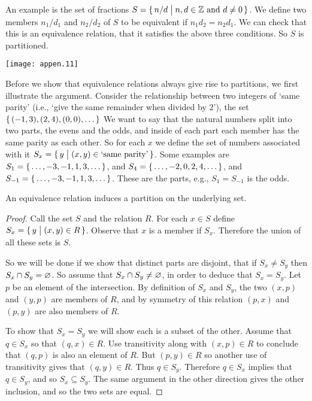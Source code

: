 An example is the set of fractions 
$S=\mbox{$\{\,n/d\bigm| \text{$n,d\in\mathbb{Z}$ and $d\neq 0$}\,\}$}$.
We define two members $n_1/d_1$ and $n_2/d_2$ of $S$ 
to be equivalent if $n_1d_2=n_2d_1$.
We can check that this is an equivalence relation, that
it satisfies the above three conditions.
So $S$ is partitioned.
\begin{center}
  \texttt{[image: appen.11]}
\end{center}

Before we show that equivalence relations always give rise to
partitions, we first illustrate the argument.
Consider the relationship between two integers of `same parity' 
(i.e., `give the same remainder when divided by \( 2 \)'),
the set \( \mbox{$\{\, (-1,3),(2,4),(0,0),\ldots\,\}$} \)
We want to say that the natural numbers split into two parts,
the evens and the odds, and inside of each part each member has the same
parity as each other.
So for each \( x \) we define the set of numbers associated with
it \( S_x=\set{y\suchthat (x,y)\in\text{`same\ parity'}} \).
Some examples are
\( S_1=\mbox{$\{\,\ldots,-3,-1,1,3,\ldots\,\}$} \), and
\( S_4=\mbox{$\{\,\ldots,-2,0,2,4,\ldots\,\}$} \), and
\( S_{-1}=\mbox{$\{\,\ldots,-3,-1,1,3,\ldots\,\}$} \).
These are the parts, e.g., \( S_1=S_{-1} \) is the odds.

\medskip
\par{}
An equivalence relation induces a partition on the underlying set.

\begin{proof}
Call the set \( S \) and the relation \( R \).
For each \( x\in S \) define \( S_x=\mbox{$\{\,y\bigm| (x,y)\in R\,\}$} \).
Observe that \( x \) is a member if \( S_x \).
Therefore the union of all these sets is \( S \).

So we will be done if we show that distinct parts are disjoint, that
if \( S_x\neq S_y \) then \( S_x\cap S_y=\varnothing \).
So assume that \( S_x\cap S_y\neq\varnothing \), in order to
deduce that \( S_x=S_y \).
Let \( p \) be an element of the intersection. 
By definition of $S_x$ and $S_y$, the two 
\( (x,p) \) and 
\( (y,p) \) are members of $R$, and by symmetry of this relation
\( (p,x) \) and
\( (p,y) \) are also members of \( R \).

To show that \( S_x=S_y \) we will show each is a subset of the other.
Assume that \( q\in S_x \) so that \( (q,x)\in R \).
Use transitivity along with
\( (x,p)\in R \) to conclude that \( (q,p) \) is also an element of \( R \).
But \( (p,y)\in R \) so another use of transitivity gives that
\( (q,y)\in  R \).
Thus \( q\in S_y \).
Therefore \( q\in S_x \) implies that \( q\in S_y \), 
and so \( S_x\subseteq S_y \).
The same argument in the other direction gives the other inclusion, and
so the two sets are equal. 
\end{proof}

